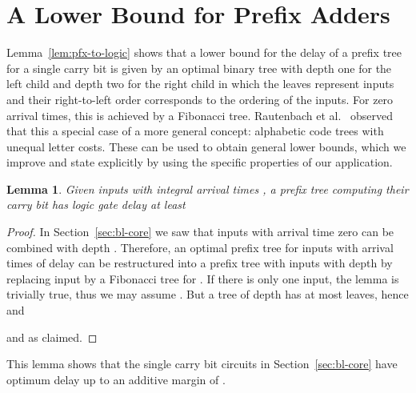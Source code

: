 \documentclass[11pt,final,microtype]{scrartcl}
\theoremstyle{plain}
\newtheorem{lemma}[theorem]{Lemma}
\theoremstyle{definition}
\theoremstyle{remark}
\begin{document}
\section{A Lower Bound for Prefix Adders} \label{sec:lb}
Lemma~\ref{lem:pfx-to-logic} shows that a lower bound for the delay of
a prefix tree for a single carry bit is given by an optimal binary
tree with depth one for the left child and depth two for the right
child in which the leaves represent inputs and their right-to-left
order corresponds to the ordering of the inputs. For zero arrival
times, this is achieved by a Fibonacci tree. Rautenbach et al.\
\cite{code-trees} observed that this a special case of a more general
concept: alphabetic code trees with unequal letter costs. These can be
used to obtain general lower bounds, which we improve and state
explicitly by using the specific properties of our application.

\begin{lemma}\label{lem:bl-lb}
  Given  inputs with integral arrival times , a prefix tree computing their carry bit  has
  logic gate delay at least
  
\end{lemma}
\begin{proof}
  In Section~\ref{sec:bl-core} we saw that  inputs with
  arrival time zero can be combined with depth . Therefore, an
  optimal prefix tree for inputs with arrival times 
  of delay  can be restructured into a prefix tree with
   inputs with depth  by replacing input
   by a Fibonacci tree for . If there is only one input,
  the lemma is trivially true, thus we may assume . But a tree of depth  has at most 
  leaves, hence  and

and  as
claimed. 
\end{proof}
This lemma shows that  the  single carry bit circuits in Section~\ref{sec:bl-core} 
have  optimum delay up to an additive margin of .


\end{document}
